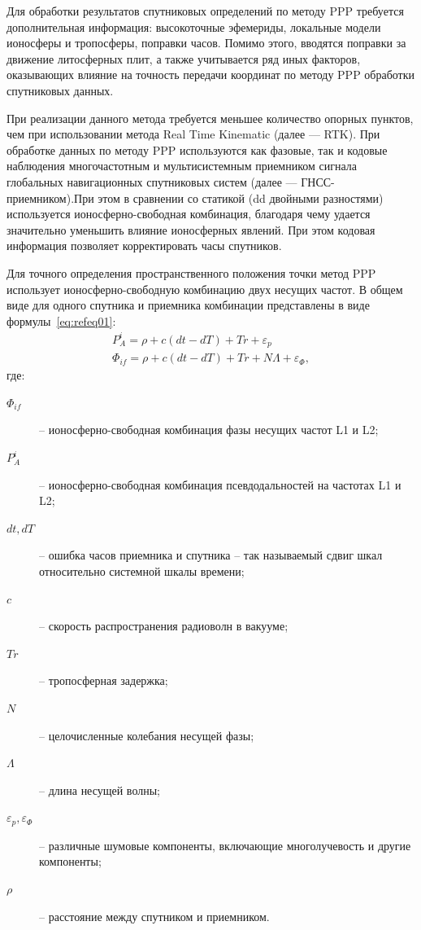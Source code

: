 \ifsynopsis %
Для обработки результатов спутниковых определений по методу PPP требуется дополнительная информация: высокоточные эфемериды, локальные модели ионосферы и тропосферы, поправки часов. Помимо этого, вводятся поправки за движение литосферных плит, а также учитывается ряд иных факторов, оказывающих влияние на точность передачи координат по методу PPP обработки спутниковых данных.

При реализации данного метода требуется меньшее количество опорных пунктов, чем при использовании метода Real Time Kinematic (далее --- RTK). При обработке данных по методу PPP используются как фазовые, так и кодовые наблюдения многочастотным и мультисистемным приемником сигнала глобальных навигационных спутниковых систем (далее --- ГНСС-приемником).При этом в сравнении со статикой (dd двойными разностями) используется ионосферно-свободная комбинация, благодаря чему удается значительно уменьшить влияние ионосферных явлений. При этом кодовая информация позволяет корректировать часы спутников.

Для точного определения пространственного положения точки метод PPP использует ионосферно-свободную комбинацию двух несущих частот. В общем виде для одного спутника и приемника комбинации представлены в виде формулы~\cref{eq:refeq01}:
\begin{equation}
	\label{eq:refeq01}
	\begin{array}{l}
		P_{A}^{i}=\rho+c\left(dt-dT\right)+Tr+\varepsilon_{p}\\
		\varPhi_{if}=\rho+c\left(dt-dT\right)+Tr+N\varLambda+\varepsilon_{\Phi},
	\end{array}
\end{equation}
где: 
\begin{description}
	\item[$\varPhi_{if}$] -- ионосферно-свободная комбинация фазы несущих частот L1 и L2; 
	\item[$P_{A}^{i}$] -- ионосферно-свободная комбинация псевдодальностей на частотах L1 и L2; 
	\item[$dt, dT$] -- ошибка часов приемника и спутника -- так называемый сдвиг шкал относительно системной шкалы времени;
	\item[$c$] -- скорость распространения радиоволн в вакууме;
	\item[$Tr$] -- тропосферная задержка;
	\item[$N$] -- целочисленные колебания несущей фазы;  
	\item[$\varLambda$] -- длина несущей волны;
	\item[$\varepsilon_{p}, \varepsilon_{\Phi}$] -- различные шумовые компоненты, включающие многолучевость и другие компоненты; 
	\item[$\rho$] -- расстояние между спутником и приемником.
\end{description}

